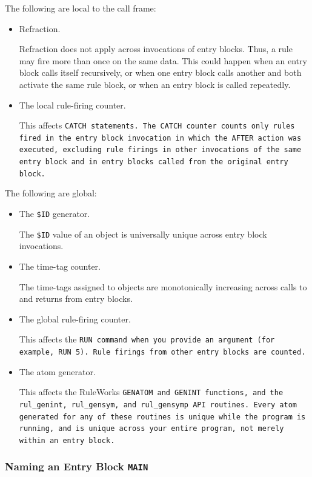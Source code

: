 The following are local to the call frame:
\begin{itemize}
\item Refraction.

  Refraction does not apply across invocations of entry blocks. Thus,
  a rule may fire more than once on the same data.  This could happen
  when an entry block calls itself recursively, or when one entry
  block calls another and both activate the same rule block, or when
  an entry block is called repeatedly.

\item The local rule-firing counter.

  This affects \tt{CATCH} statements. The \tt{CATCH} counter counts
  only rules fired in the entry block invocation in which the
  \tt{AFTER} action was executed, excluding rule firings in other
  invocations of the same entry block and in entry blocks called from
  the original entry block.
\end{itemize}

The following are global:
\begin{itemize}
\item The \verb|$ID| generator.

  The \verb|$ID| value of an object is universally unique across entry
  block invocations.

\item The time-tag counter.

  The time-tags assigned to objects are monotonically increasing
  across calls to and returns from entry blocks.

\item The global rule-firing counter.

  This affects the \tt{RUN} command when you provide an argument (for
  example, \tt{RUN} 5).  Rule firings from other entry blocks are
  counted.

\item The atom generator.

  This affects the RuleWorks \tt{GENATOM} and \tt{GENINT} functions,
  and the \verb|rul_genint|, \verb|rul_gensym|, and \verb|rul_gensymp|
  API routines.  Every atom generated for any of these routines is
  unique while the program is running, and is unique across your
  entire program, not merely within an entry block.
\end{itemize}

\subsubsection{Naming an Entry Block \tt{MAIN}}

